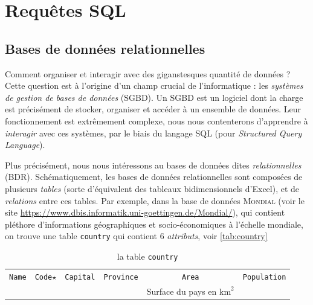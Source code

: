 

\section{Requêtes SQL}

\subsection{{Bases de données relationnelles}}

Comment organiser et interagir avec des giganstesques quantité de données ? Cette question est à l'origine d'un champ crucial de l'informatique : les \textit{systèmes de gestion de bases de données} (SGBD). Un SGBD est un logiciel dont la charge est précisément de stocker, organiser et accéder à un ensemble de données. Leur fonctionnement est extrêmement complexe, nous nous contenterons d'apprendre à \textit{interagir} avec ces systèmes, par le biais du langage SQL (pour \textit{Structured Query Language}).


Plus précisément, nous nous intéressons au bases de données dites \textit{relationnelles} (BDR). Schématiquement, les bases de données relationnelles sont composées de plusieurs \textit{tables} (sorte d'équivalent des tableaux bidimensionnels d'Excel), et de \textit{relations} entre ces tables. Par exemple, dans la base de données \textsc{Mondial} (voir le site \href{The MONDIAL Database}{https://www.dbis.informatik.uni-goettingen.de/Mondial/}), qui contient pléthore d'informations géographiques et socio-économiques à l'échelle mondiale, on trouve une table \texttt{country} qui contient 6 \textit{attributs}, voir \autoref{tab:country}


\begin{table}[h!]
	\centering
	\begin{tabular}{|cccccc|}
		\hline
		\texttt{Name} & \texttt{Code}$ \star $ & \texttt{Capital} & \texttt{Province} & \texttt{Area}                        & \texttt{Population} \\
		              &                        &                  &                   & Surface du pays en $ \textrm{km}^2 $ &                     \\
		\hline
	\end{tabular}
	\caption{la table \texttt{country} }
	\label{tab:country}
\end{table}

